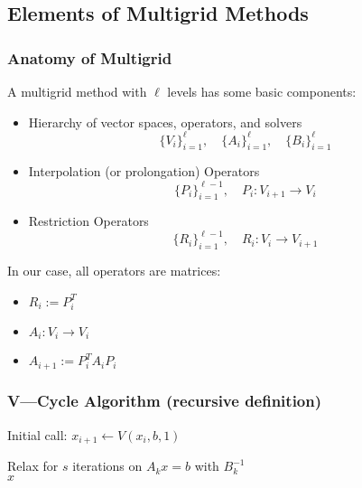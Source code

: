 \documentclass[xcolor=dvipsnames]{beamer}
\begin{document}
\subsection{Elements of Multigrid Methods}
\begin{frame}
  \frametitle{Anatomy of Multigrid}

  A multigrid method with $\ell$ levels has some basic components:

  \begin{itemize}
    \item Hierarchy of vector spaces, operators, and solvers
      $$\{V_i\}_{i=1}^\ell, \quad \{A_i\}_{i=1}^\ell, \quad \{B_i\}_{i=1}^\ell$$
    \item Interpolation (or prolongation) Operators 
      $$\{P_i\}_{i=1}^{\ell-1},\quad P_i : V_{i+1} \to V_i$$
    \item Restriction Operators 
      $$\{R_i\}_{i=1}^{\ell-1},\quad R_i : V_i \to V_{i+1}$$
  \end{itemize}
  
  In our case, all operators are matrices:
  \begin{itemize}
    \item $R_i := P_i^T$
    \item $A_i : V_i \to V_i$
    \item $A_{i+1} := P_i^T A_i P_i$ 
  \end{itemize}
\end{frame}

\begin{frame}
  \frametitle{V---Cycle Algorithm (recursive definition)}
  Initial call: $x_{i+1} \gets V(x_i, b, 1)$\\
  \vspace{1em}

  \DontPrintSemicolon
  \setcounter{AlgoLine}{0}
  \BlankLine
  Relax for $s$ iterations on $A_k x = b$ with $B_k^{-1}$\\
  \KwRet $x$
\end{frame}
\end{document}

